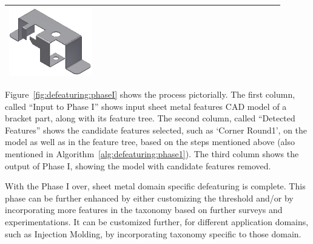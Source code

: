 \begin{minipage}[t]{\linewidth}
\begin{tabular}[!h]{@{} p{0.3\linewidth} | p{0.3\linewidth} | p{0.3\linewidth}@{}}
\includegraphics[width=0.98\linewidth]{images/DefeatPhase_I_3} \\ \bottomrule

\end{tabular}
\label{fig:defeaturing:phaseI}
\end{minipage}

Figure~\ref{fig:defeaturing:phaseI} shows the process pictorially. The first column, called ``Input to Phase I'' shows input sheet metal features CAD model of a bracket part, along with its feature tree. The second column, called ``Detected Features'' shows the candidate features selected, such as `Corner Round1', on the model as well as in the feature tree, based on the steps mentioned above (also mentioned in Algorithm~\ref{alg:defeaturing:phase1}).  The third column shows the output of Phase I, showing the model with candidate features removed.








With the Phase I over, sheet metal domain specific defeaturing is complete. This phase can be further enhanced by either customizing the threshold and/or by incorporating more features in the taxonomy based on further surveys and experimentations. It can be customized further, for different application domains, such as Injection Molding, by incorporating taxonomy specific to those domain. 

